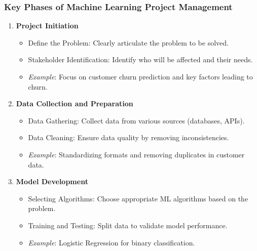 \documentclass[aspectratio=169]{beamer}
\begin{document}
\begin{frame}[fragile]
    \frametitle{Key Phases of Machine Learning Project Management}
    \begin{enumerate}
        \item \textbf{Project Initiation}
        \begin{itemize}
            \item Define the Problem: Clearly articulate the problem to be solved.
            \item Stakeholder Identification: Identify who will be affected and their needs.
            \item \textit{Example}: Focus on customer churn prediction and key factors leading to churn.
        \end{itemize}
        
        \item \textbf{Data Collection and Preparation}
        \begin{itemize}
            \item Data Gathering: Collect data from various sources (databases, APIs).
            \item Data Cleaning: Ensure data quality by removing inconsistencies.
            \item \textit{Example}: Standardizing formats and removing duplicates in customer data.
        \end{itemize}
        
        \item \textbf{Model Development}
        \begin{itemize}
            \item Selecting Algorithms: Choose appropriate ML algorithms based on the problem.
            \item Training and Testing: Split data to validate model performance.
            \item \textit{Example}: Logistic Regression for binary classification.
        \end{itemize}
    \end{enumerate}
\end{frame}
\end{document}
